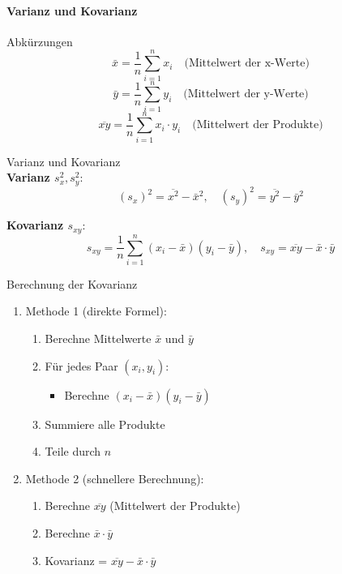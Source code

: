 \paragraph{Varianz und Kovarianz}

\begin{concept}{Abkürzungen}\\
$$\bar{x} = \frac{1}{n}\sum_{i=1}^{n} x_i \quad \text{(Mittelwert der x-Werte)}$$
$$\bar{y} = \frac{1}{n}\sum_{i=1}^{n} y_i \quad \text{(Mittelwert der y-Werte)}$$
$$\overline{xy} = \frac{1}{n}\sum_{i=1}^{n} x_i \cdot y_i \quad \text{(Mittelwert der Produkte)}$$
\end{concept}

\begin{definition}{Varianz und Kovarianz}\\
\textbf{Varianz $s_x^2, s_y^2$}:
$$(s_x)^2 = \overline{x^2} - \bar{x}^2, \quad (s_y)^2 = \overline{y^2} - \bar{y}^2$$

\textbf{Kovarianz $s_{xy}$}:
$$s_{xy} = \frac{1}{n}\sum_{i=1}^{n}(x_i - \bar{x})(y_i - \bar{y}), \quad s_{xy} = \overline{xy} - \bar{x} \cdot \bar{y}$$
\end{definition}

\begin{KR}{Berechnung der Kovarianz}
\begin{enumerate}
    \item Methode 1 (direkte Formel):
        \begin{enumerate}
            \item Berechne Mittelwerte $\bar{x}$ und $\bar{y}$
            \item Für jedes Paar $(x_i,y_i)$:
                \begin{itemize}
                    \item Berechne $(x_i - \bar{x})(y_i - \bar{y})$
                \end{itemize}
            \item Summiere alle Produkte
            \item Teile durch $n$
        \end{enumerate}
    \item Methode 2 (schnellere Berechnung):
        \begin{enumerate}
            \item Berechne $\overline{xy}$ (Mittelwert der Produkte)
            \item Berechne $\bar{x} \cdot \bar{y}$
            \item Kovarianz = $\overline{xy} - \bar{x} \cdot \bar{y}$
        \end{enumerate}
\end{enumerate}
\end{KR}

